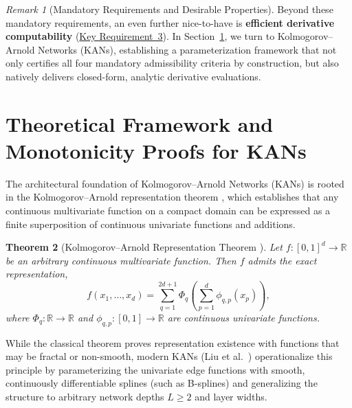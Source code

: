 \documentclass[11pt,a4paper]{article}
\theoremstyle{plain}
\newtheorem{theorem}{Theorem}[section]
\theoremstyle{definition}
\theoremstyle{remark}
\newtheorem{remark}[theorem]{Remark}
\begin{document}
\begin{remark}[Mandatory Requirements and Desirable Properties]
\label{rem:admissibility_synthesis}
Beyond these mandatory requirements, an even further nice-to-have is \textbf{efficient derivative computability} (\hyperref[req:key_requirement_3]{Key Requirement~3}). In Section~\ref{sec:kan_theoretical_framework}, we turn to Kolmogorov--Arnold Networks (KANs), establishing a parameterization framework that not only certifies all four mandatory admissibility criteria by construction, but also natively delivers closed-form, analytic derivative evaluations.
\end{remark}

\section{Theoretical Framework and Monotonicity Proofs for KANs}
\label{sec:kan_theoretical_framework}

The architectural foundation of Kolmogorov--Arnold Networks (KANs) \cite{liu2024kan} is rooted in the Kolmogorov--Arnold representation theorem \cite{kolmogorov1957representation}, which establishes that any continuous multivariate function on a compact domain can be expressed as a finite superposition of continuous univariate functions and additions.

\begin{theorem}[Kolmogorov--Arnold Representation Theorem \cite{kolmogorov1957representation}]
\label{thm:kart}
Let $f: [0, 1]^d \to \mathbb{R}$ be an arbitrary continuous multivariate function. Then $f$ admits the exact representation,
\begin{equation}
    f(x_1, \dots, x_d) = \sum_{q=1}^{2d+1} \Phi_q \left( \sum_{p=1}^d \phi_{q, p}(x_p) \right),
    \label{eq:kart}
\end{equation}
where $\Phi_q: \mathbb{R} \to \mathbb{R}$ and $\phi_{q, p}: [0, 1] \to \mathbb{R}$ are continuous univariate functions.
\end{theorem}

While the classical theorem proves representation existence with functions that may be fractal or non-smooth, modern KANs (Liu et al.\ \cite{liu2024kan}) operationalize this principle by parameterizing the univariate edge functions with smooth, continuously differentiable splines (such as B-splines) and generalizing the structure to arbitrary network depths $L \ge 2$ and layer widths.
\end{document}
